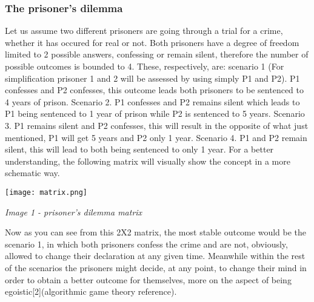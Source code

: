\documentclass[conference]{IEEEtran}
\begin{document}
\subsubsection{The prisoner's dilemma}
Let us assume two different prisoners are going through a trial for a crime, whether it has occured for real or not. Both prisoners have a degree of freedom limited to 2 possible answers, confessing or remain silent, therefore the number of possible outcomes is bounded to 4. These, respectively, are: scenario 1 (For simplification prisoner 1 and 2 will be assessed by using simply P1 and P2). P1 confesses and P2 confesses, this outcome leads both prisoners to be sentenced to 4 years of prison. Scenario 2. P1 confesses and P2 remains silent which leads to P1 being sentenced to 1 year of prison while P2 is sentenced to 5 years. Scenario 3. P1 remains silent and P2 confesses, this will result in the opposite of what just mentioned, P1 will get 5 years and P2 only 1 year. Scenario 4. P1 and P2 remain silent, this will lead to both being sentenced to only 1 year. For a better understanding, the following matrix will visually show the concept in a more schematic way.
\centerline{\texttt{[image: matrix.png]}}  
\centerline{\textit{Image 1 - prisoner's dilemma matrix}}

Now as you can see from this 2X2 matrix, the most stable outcome would be the scenario 1, in which both prisoners confess the crime and are not, obviously, allowed to change their declaration at any given time. Meanwhile within the rest of the scenarios the prisoners might decide, at any point, to change their mind in order to obtain a better outcome for themselves, more on the aspect of being egoistic[2](algorithmic game theory reference).
\end{document}
